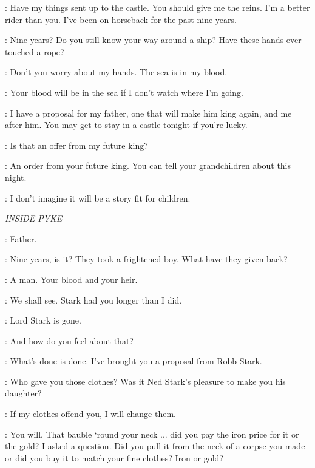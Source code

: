 
\THEON: Have my things sent up to the castle.  You should give me the reins. I'm a better rider than you. I've been on horseback for the past nine years.

\YARA: Nine years? Do you still know your way around a ship? Have these hands ever touched a rope?

\THEON: Don't you worry about my hands. The sea is in my blood.


\YARA: Your blood will be in the sea if I don't watch where I'm going.

\THEON: I have a proposal for my father, one that will make him king again, and me after him. You may get to stay in a castle tonight if you're lucky.

\YARA: Is that an offer from my future king?

\THEON: An order from your future king. You can tell your grandchildren about this night.

\YARA: I don't imagine it will be a story fit for children.


\scene

\textit{INSIDE PYKE}


\THEON: Father.

\BALON: Nine years, is it? They took a frightened boy. What have they given back?

\THEON: A man. Your blood and your heir.

\BALON: We shall see. Stark had you longer than I did.

\THEON: Lord Stark is gone.

\BALON: And how do you feel about that?

\THEON: What's done is done. I've brought you a proposal from Robb Stark.

\BALON: Who gave you those clothes? Was it Ned Stark's pleasure to make you his daughter?

\THEON: If my clothes offend you, I will change them.

\BALON: You will. That bauble `round your neck ... did you pay the iron price for it or the gold?  I asked a question. Did you pull it from the neck of a corpse you made or did you buy it to match your fine clothes? Iron or gold?

